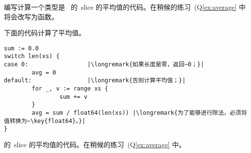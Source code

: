 \begin{Exercise}[title={Average},difficulty=4]
\label{ex:average no func}
\Question\label{ex:average no func q1} 编写计算一个类型是~
 的~slice 的平均值的代码。在稍候的练习~(Q\ref{ex:average} 
中将会改写为函数。
\end{Exercise}

\begin{Answer}
\Question 下面的代码计算了平均值。
\begin{lstlisting}
sum := 0.0 
switch len(xs) {
case 0:                 |\longremark{如果长度是零，返回~0；}|
        avg = 0
default:                |\longremark{否则计算平均值；}|
        for _, v := range xs {
                sum += v
        }
        avg = sum / float64(len(xs)) |\longremark{为了能够进行除法，必须将值转换为~\key{float64}。}|
}
\end{lstlisting}
\showremarks
\end{Answer}
 的~slice 的平均值的代码。在稍候的练习~(Q\ref{ex:average} 中。
